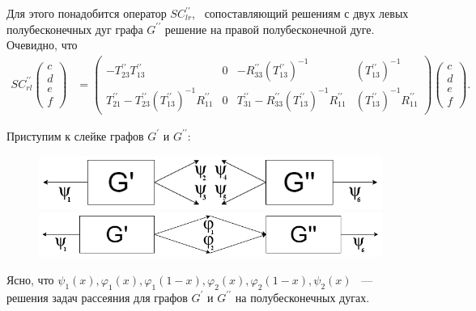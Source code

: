\documentclass[a4 paper, 12 pt]{extarticle}
\begin{document}
   Для этого понадобится оператор $SC_{lr}^{\prime\prime}$, \ сопоставляющий решениям с двух левых полубесконечных дуг графа $G^{\prime\prime}$ решение на правой полубесконечной дуге. Очевидно, что
    \[
   \begin{aligned}
   SC_{rl}^{\prime\prime}\left(
   \begin{array}{c}
   c \\
   d \\
   e \\
   f
   \end{array}\right) &= \left(\begin{array}{cccc}
   -T_{23}^{\prime\prime} T_{13}^{\prime\prime} & 0 & -R_{33}^{\prime\prime} \left(T_{13}^{\prime\prime}\right)^{-1} & \left(T_{13}^{\prime\prime}\right)^{-1} \\
   T_{21}^{\prime\prime}- T_{23}^{\prime\prime}\left(T_{13}^{\prime\prime}\right)^{-1}R_{11}^{\prime\prime} & 0 & T_{31}^{\prime\prime} - R_{33}^{\prime\prime} \left(T_{13}^{\prime\prime}\right)^{-1}R_{11}^{\prime\prime} & \left(T_{13}^{\prime\prime}\right)^{-1}R_{11}^{\prime\prime}
   \end{array}\right)
   \left(\begin{array}{c}
   c \\
   d \\
   e \\
   f
   \end{array}\right).
   \end{aligned}\]
   
   Приступим к слейке графов $G^\prime$ и $G^{\prime \prime}$:
   \begin{figure}[!htb]
   	\centering
   	\includegraphics[scale=0.54]{skleika2.png} \\
   	\includegraphics[scale=0.45]{skleika3.png}
   \end{figure}
   
   Ясно, что $\psi_1\left(x\right), \varphi_1\left(x\right), \varphi_1\left(1-x\right), \varphi_2\left(x\right), \varphi_2\left(1-x\right), \psi_2\left(x\right)$ ~--- решения задач рассеяния для графов  $G^\prime$ и $G^{\prime \prime}$ на полубесконечных дугах.
   
\end{document}
